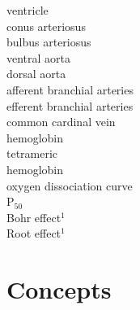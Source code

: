 \documentclass[letterpaper]{tufte-handout}
\begin{document}
\begin{multicols}{2}
ventricle \\
conus arteriosus \\
bulbus arteriosus \\
ventral aorta \\
dorsal aorta \\
afferent branchial arteries \\
efferent branchial arteries \\
common cardinal vein \\
hemoglobin \\
tetrameric \\ \hspace{2ex}hemoglobin \\
oxygen dissociation curve \\
P$_{50}$ \\
Bohr effect$^1$ \\
Root effect$^1$
\end{multicols}

\section{Concepts}
\end{document}
